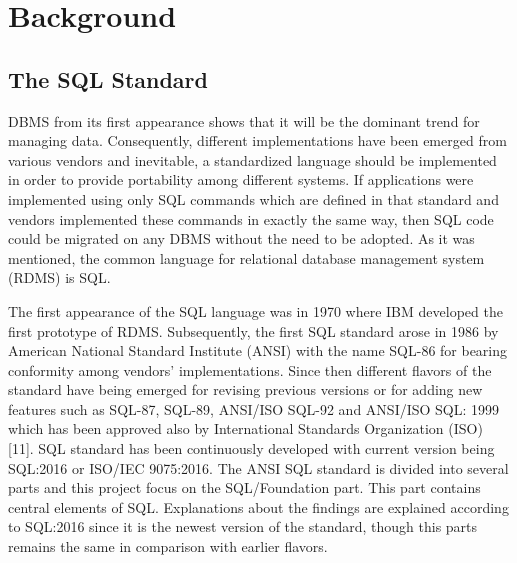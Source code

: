 \chapter{Background}

\section{The SQL Standard }
DBMS from its first appearance shows that it will be the dominant trend for managing data. Consequently, different implementations have been emerged from various vendors and inevitable, a standardized language should be implemented in order to provide portability among different systems. If applications were implemented using only SQL commands which are defined in that standard and vendors implemented these commands in exactly the same way, then SQL code could be migrated on any DBMS without the need to be adopted. As it was mentioned, the common language for relational database management system (RDMS) is SQL. 

The first appearance of the SQL language was in 1970 where IBM developed the first prototype of RDMS. Subsequently, the first SQL standard arose in 1986 by American National Standard Institute (ANSI) with the name SQL-86 for bearing conformity among vendors’ implementations. Since then different flavors of the standard have being emerged for revising previous versions or for adding new features such as SQL-87, SQL-89, ANSI/ISO SQL-92 and  ANSI/ISO SQL: 1999 which has been approved also by International Standards Organization (ISO) [11]. SQL standard has been continuously developed with current version being SQL:2016 or ISO/IEC 9075:2016. The ANSI SQL standard is divided into several parts and this project focus on the SQL/Foundation part. This part contains central elements of SQL. Explanations about the findings are explained according to SQL:2016 since it is the newest version of the standard, though this parts  remains the same in comparison with earlier flavors. 


